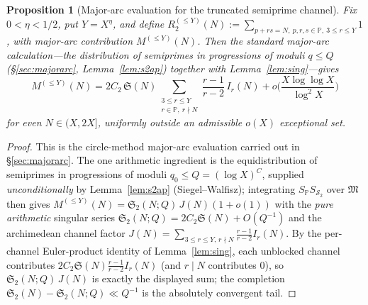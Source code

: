 \documentclass[]{interact}%
\newtheorem{proposition}{Proposition}
\newcommand{\PP}{\mathbb P}
\newcommand{\SSemi}{\mathcal S_2}
\newcommand{\sing}{\mathfrak S}
\begin{document}
\begin{proposition}[Major-arc evaluation for the truncated semiprime channel]\label{prop:major}
Fix $0<\eta<1/2$, put $Y=X^\eta$, and define
$R_2^{(\le Y)}(N):=\sum_{p+rs=N,\ p,r,s\in\PP,\ 3\le r\le Y}1$, with major-arc contribution
$M^{(\le Y)}(N)$. Then the standard major-arc calculation---the distribution of semiprimes in
progressions of moduli $q\le Q$ (\S\ref{sec:majorarc}, Lemma~\ref{lem:s2ap}) together with
Lemma~\ref{lem:sing}---gives
\[
  M^{(\le Y)}(N)=2C_2\,\sing(N)\sum_{\substack{3\le r\le Y\\ r\in\PP,\ r\nmid N}}\frac{r-1}{r-2}\,I_r(N)
  +o\Big(\frac{X\log\log X}{\log^2X}\Big)
\]
for even $N\in(X,2X]$, uniformly outside an admissible $o(X)$ exceptional set.
\end{proposition}
\begin{proof}
This is the circle-method major-arc evaluation carried out in \S\ref{sec:majorarc}. The one
arithmetic ingredient is the equidistribution of semiprimes in progressions of moduli
$q_0\le Q=(\log X)^{C}$, supplied \emph{unconditionally} by Lemma~\ref{lem:s2ap}
(Siegel--Walfisz); integrating $S_\PP S_{\SSemi}$ over $\mathfrak M$ then gives
$M^{(\le Y)}(N)=\mathfrak S_2(N;Q)\,J(N)(1+o(1))$ with the \emph{pure arithmetic} singular series
$\mathfrak S_2(N;Q)=2C_2\sing(N)+O(Q^{-1})$ and the archimedean channel factor
$J(N)=\sum_{3\le r\le Y,\,r\nmid N}\frac{r-1}{r-2}I_r(N)$. By the per-channel Euler-product
identity of Lemma~\ref{lem:sing}, each unblocked channel contributes
$2C_2\sing(N)\frac{r-1}{r-2}I_r(N)$ (and $r\mid N$ contributes $0$), so $\mathfrak S_2(N;Q)\,J(N)$
is exactly the displayed sum; the completion $\mathfrak S_2(N)-\mathfrak S_2(N;Q)\ll Q^{-1}$ is
the absolutely convergent tail.
\end{proof}
\end{document}

